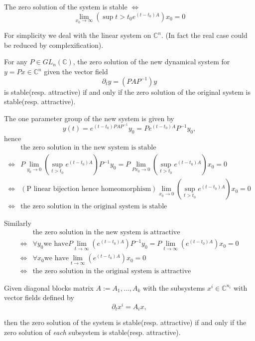 \documentclass{tufte-handout}
\newcommand{\C}{\mathbb{C}}
\begin{document}
The zero solution of the system is stable $\iff$ \[ \lim_{x_0 \to \infty} (\sup{t>t_0} e^{(t-t_0)A}) x_0 =0 \]

For simplicity we deal with the linear system on $\mathbb{C}^n$. (In fact the real case could be reduced by complexification).
\begin{lemma} 
	For any $P \in GL_n(\mathbb{C})$, the zero solution of the new dynamical system for $y= Px \in \mathbb{C}^n$ given the vector field \[ \partial_t y = (PAP^{-1})y \] is stable(resp. attractive) if and only if the zero solution of the original system is stable(resp. attractive).
\end{lemma}
\begin{formalproof} 
The one parameter group of the new system is given by \[ y(t) = e^{(t-t_0)PAP^{-1}}y_0 = Pe^{(t-t_0)A}P^{-1}y_0, \]
hence  
\begin{align*}
   & \text{the zero solution in the new system is stable} \\
	\iff & P \lim_{y_0 \to 0} (\sup_{t>t_0} e^{(t-t_0)A}) P^{-1} y_0 = P  \lim_{P x_0 \to 0} (\sup_{t>t_0} e^{(t-t_0)A}) x_0 =0  \\
	\iff & ({\text{P linear bijection hence homeomorphism}})  \lim_{x_0 \to 0} (\sup_{t>t_0} e^{(t-t_0)A}) x_0 =0 \\
	\iff & \text{the zero solution in the original system is stable}
	\end{align*}
	
	
Similarly 
\begin{align*}
    & \text{the zero solution in the new system is attractive} \\
	\iff & \forall y_0 \text{we have} P \lim_{t \to \infty} ( e^{(t-t_0)A}) P^{-1} y_0 = P  \lim_{t \to \infty} (e^{(t-t_0)A}) x_0 =0  \\
	\iff & \forall x_0 \text{we have} \lim_{t \to \infty} ( e^{(t-t_0)A}) x_0 =0 \\
	\iff & \text{the zero solution in the original system is attractive}
\end{align*}
\end{formalproof}
\begin{lemma} Given  diagonal blocks matrix $A:={A_1,...,A_k}$
	with	the subsystems $x^i \in \C^{n_i}$ with vector fields defined by \[ \partial_t x^i = A_i x, \]

	then the zero solution of the system is stable(resp. attractive) if and only if the zero solution of \emph{each} subsystem is stable(resp. attractive).
\end{lemma}
\end{document}
